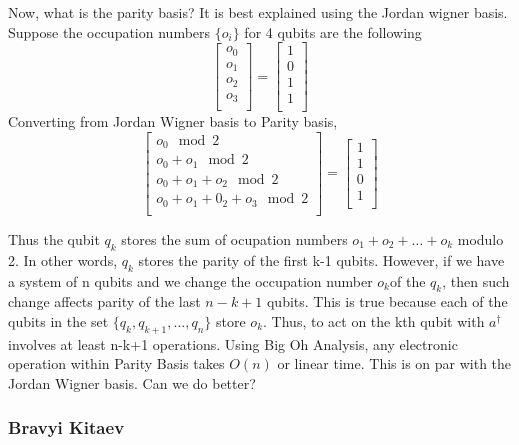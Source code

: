 \documentclass{article}
\begin{document}
    Now, what is the parity basis? It is best explained
    using the Jordan wigner basis. Suppose the occupation
    numbers \(\{o_i\}\) for 4 qubits are the following
    \[
    \begin{bmatrix}
     o_0\\
     o_1\\
     o_2  \\
     o_3\\
    \end{bmatrix}
    =
    \begin{bmatrix}
    1 \\
    0 \\
    1 \\
    1 \\
    \end{bmatrix}
    \]
    Converting from Jordan Wigner basis to Parity basis,
    \[
    \begin{bmatrix}
     o_0 \mod 2\\
     o_0 + o_1 \mod 2\\
     o_0 + o_1 + o_2  \mod 2\\
     o_0 + o_1+ 0_2 + o_3 \mod 2\\
    \end{bmatrix}
    =
    \begin{bmatrix}
    1 \\
    1 \\
    0 \\
    1 \\
    \end{bmatrix}
    \]

    Thus the qubit \(q_k\) stores the sum of ocupation numbers
    \(o_1 + o_2 + \ldots + o_k\) modulo 2. In other words,
    \(q_k\) stores the parity of the first k-1 qubits.
    However, if we have a system of n qubits and we change the occupation
    number \(o_k\)of the \(q_k\), then such change affects parity of the last
    \(n-k+1\) qubits. This is true because each of the qubits in the set \(\{q_{k}, q_{k+1}, \ldots, q_n\}\) store \(o_k\). Thus, to act on the kth qubit with \(a^{\dagger}\) involves
    at least n-k+1 operations. Using Big Oh Analysis, any electronic operation
    within Parity Basis takes \(O(n)\) or linear time. This is on par with
    the Jordan Wigner basis. Can we do better?


    \subsubsection{Bravyi Kitaev}
\end{document}
